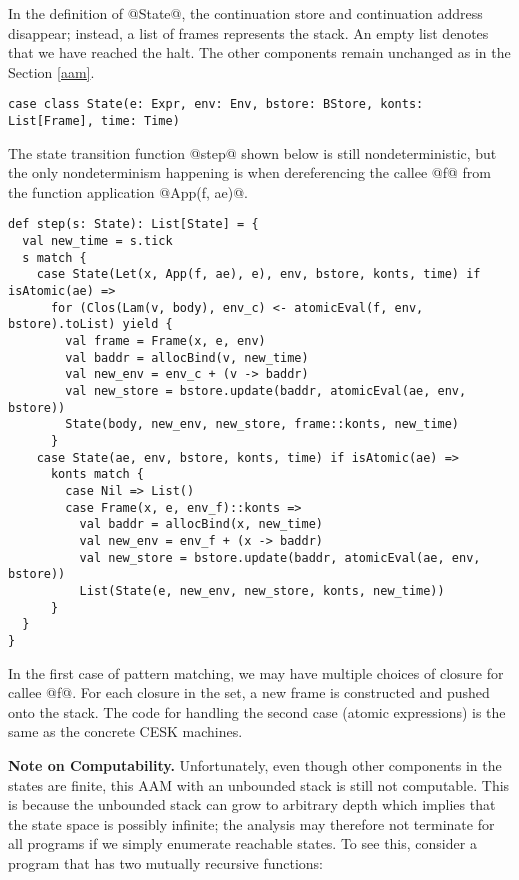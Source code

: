 \documentclass[acmsmall]{acmart}\settopmatter{}
\begin{document}
In the definition of @State@, the continuation store and continuation address disappear;
instead, a list of frames represents the stack. An empty list denotes that we have reached 
the halt. The other components remain unchanged as in the Section \ref{aam}.

\begin{lstlisting}
case class State(e: Expr, env: Env, bstore: BStore, konts: List[Frame], time: Time)
\end{lstlisting}

The state transition function @step@ shown below is still nondeterministic, but the only 
nondeterminism happening is when dereferencing the callee @f@ from the function application 
@App(f, ae)@.

\begin{lstlisting}
def step(s: State): List[State] = {
  val new_time = s.tick
  s match {
    case State(Let(x, App(f, ae), e), env, bstore, konts, time) if isAtomic(ae) =>
      for (Clos(Lam(v, body), env_c) <- atomicEval(f, env, bstore).toList) yield {
        val frame = Frame(x, e, env)
        val baddr = allocBind(v, new_time)
        val new_env = env_c + (v -> baddr)
        val new_store = bstore.update(baddr, atomicEval(ae, env, bstore))
        State(body, new_env, new_store, frame::konts, new_time)
      }
    case State(ae, env, bstore, konts, time) if isAtomic(ae) =>
      konts match {
        case Nil => List()
        case Frame(x, e, env_f)::konts =>
          val baddr = allocBind(x, new_time)
          val new_env = env_f + (x -> baddr)
          val new_store = bstore.update(baddr, atomicEval(ae, env, bstore))
          List(State(e, new_env, new_store, konts, new_time))
      }
  }
}
\end{lstlisting}

In the first case of pattern matching, we may have multiple choices of closure for callee @f@.
For each closure in the set, a new frame is constructed and pushed onto the stack.
The code for handling the second case (atomic expressions) is the same as the concrete CESK
machines.

\textbf{Note on Computability.}
Unfortunately, even though other components in the states are finite,
this AAM with an unbounded stack is still not computable.
This is because the unbounded stack can grow to arbitrary depth which implies that the state
space is possibly infinite; the analysis may therefore not terminate for all programs if we
simply enumerate reachable states. To see this, consider a program that has two mutually
recursive functions:
\end{document}
